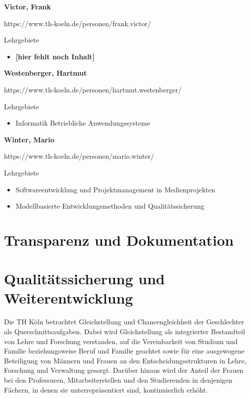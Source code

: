 \textbf{Victor, Frank}

https://www.th-koeln.de/personen/frank.victor/

Lehrgebiete

\begin{itemize}
\tightlist
\item
  \textbf{{[}hier fehlt noch Inhalt{]}}
\end{itemize}

\textbf{Westenberger, Hartmut}

https://www.th-koeln.de/personen/hartmut.westenberger/

Lehrgebiete

\begin{itemize}
\tightlist
\item
  Informatik Betriebliche Anwendungssysteme
\end{itemize}

\textbf{Winter, Mario}

https://www.th-koeln.de/personen/mario.winter/

Lehrgebiete

\begin{itemize}
\tightlist
\item
  Softwareentwicklung und Projektmanagement in Medienprojekten
\item
  Modellbasierte Entwicklungsmethoden und Qualitätssicherung
\end{itemize}

\chapter{Transparenz und
Dokumentation}\label{transparenz-und-dokumentation}

\chapter{Qualitätssicherung und
Weiterentwicklung}\label{qualituxe4tssicherung-und-weiterentwicklung}

Die TH Köln betrachtet Gleichstellung und Chancengleichheit der
Geschlechter als Querschnittsaufgaben. Dabei wird Gleichstellung als
integrierter Bestandteil von Lehre und Forschung verstanden, auf die
Vereinbarkeit von Studium und Familie beziehungsweise Beruf und Familie
geachtet sowie für eine ausgewogene Beteiligung von Männern und Frauen
an den Entscheidungsstrukturen in Lehre, Forschung und Verwaltung
gesorgt. Darüber hinaus wird der Anteil der Frauen bei den Professuren,
Mitarbeiterstellen und den Studierenden in denjenigen Fächern, in denen
sie unterrepräsentiert sind, kontinuierlich erhöht.

